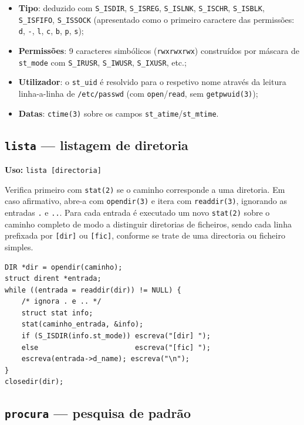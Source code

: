 \documentclass[11pt,a4paper]{article}
\begin{document}
\begin{itemize}[leftmargin=1.5em]
    \item \textbf{Tipo}: deduzido com \texttt{S\_ISDIR}, \texttt{S\_ISREG}, \texttt{S\_ISLNK}, \texttt{S\_ISCHR}, \texttt{S\_ISBLK}, \texttt{S\_ISFIFO}, \texttt{S\_ISSOCK} (apresentado como o primeiro caractere das permissões: \texttt{d}, \texttt{-}, \texttt{l}, \texttt{c}, \texttt{b}, \texttt{p}, \texttt{s});
    \item \textbf{Permissões}: 9 caracteres simbólicos (\texttt{rwxrwxrwx}) construídos por máscara de \texttt{st\_mode} com \texttt{S\_IRUSR}, \texttt{S\_IWUSR}, \texttt{S\_IXUSR}, etc.;
    \item \textbf{Utilizador}: o \texttt{st\_uid} é resolvido para o respetivo nome através da leitura linha-a-linha de \texttt{/etc/passwd} (com \texttt{open}/\texttt{read}, sem \texttt{getpwuid(3)});
    \item \textbf{Datas}: \texttt{ctime(3)} sobre os campos \texttt{st\_atime}/\texttt{st\_mtime}.
\end{itemize}

\subsection{\texttt{lista} --- listagem de diretoria}

\textbf{Uso:} \texttt{lista [directoria]}

Verifica primeiro com \texttt{stat(2)} se o caminho corresponde a uma diretoria. Em caso afirmativo, abre-a com \texttt{opendir(3)} e itera com \texttt{readdir(3)}, ignorando as entradas \texttt{.} e \texttt{..}. Para cada entrada é executado um novo \texttt{stat(2)} sobre o caminho completo de modo a distinguir diretorias de ficheiros, sendo cada linha prefixada por \texttt{[dir]} ou \texttt{[fic]}, conforme se trate de uma directoria ou ficheiro simples.

\begin{lstlisting}[style=cstyle,caption={Núcleo de \texttt{lista.c}}]
DIR *dir = opendir(caminho);
struct dirent *entrada;
while ((entrada = readdir(dir)) != NULL) {
    /* ignora . e .. */
    struct stat info;
    stat(caminho_entrada, &info);
    if (S_ISDIR(info.st_mode)) escreva("[dir] ");
    else                       escreva("[fic] ");
    escreva(entrada->d_name); escreva("\n");
}
closedir(dir);
\end{lstlisting}

\subsection{\texttt{procura} --- pesquisa de padrão}
\end{document}
